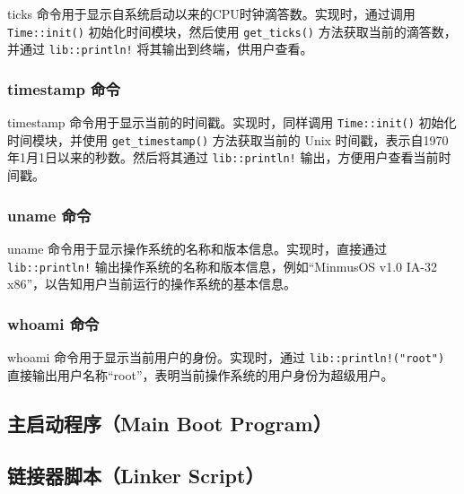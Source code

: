 ticks 命令用于显示自系统启动以来的CPU时钟滴答数。实现时，通过调用 \texttt{Time::init()} 初始化时间模块，然后使用 \texttt{get\_ticks()} 方法获取当前的滴答数，并通过 \texttt{lib::println!} 将其输出到终端，供用户查看。

\subsubsection{timestamp 命令}

timestamp 命令用于显示当前的时间戳。实现时，同样调用 \texttt{Time::init()} 初始化时间模块，并使用 \texttt{get\_timestamp()} 方法获取当前的 Unix 时间戳，表示自1970年1月1日以来的秒数。然后将其通过 \texttt{lib::println!} 输出，方便用户查看当前时间戳。

\subsubsection{uname 命令}

uname 命令用于显示操作系统的名称和版本信息。实现时，直接通过 \texttt{lib::println!} 输出操作系统的名称和版本信息，例如“MinmusOS v1.0 IA-32 x86”，以告知用户当前运行的操作系统的基本信息。

\subsubsection{whoami 命令}

whoami 命令用于显示当前用户的身份。实现时，通过 \texttt{lib::println!("root")} 直接输出用户名称“root”，表明当前操作系统的用户身份为超级用户。

\subsection{主启动程序（Main Boot Program）}

\subsection{链接器脚本（Linker Script）}